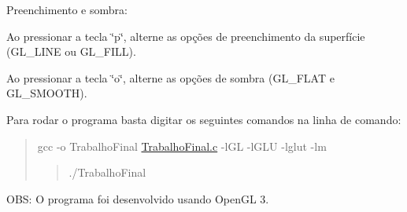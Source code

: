Preenchimento e sombra\+:
\begin{DoxyItemize}
\item Ao pressionar a tecla \char`\"{}p\char`\"{}, alterne as opções de preenchimento da superfície (G\+L\+\_\+\+L\+I\+N\+E ou G\+L\+\_\+\+F\+I\+L\+L).
\item Ao pressionar a tecla \char`\"{}o\char`\"{}, alterne as opções de sombra (G\+L\+\_\+\+F\+L\+A\+T e G\+L\+\_\+\+S\+M\+O\+O\+T\+H).
\end{DoxyItemize}

Para rodar o programa basta digitar os seguintes comandos na linha de comando\+:

\begin{quote}
gcc -\/o Trabalho\+Final \hyperlink{TrabalhoFinal_8c}{Trabalho\+Final.\+c} -\/l\+G\+L -\/l\+G\+L\+U -\/lglut -\/lm \begin{quote}
./\+Trabalho\+Final \end{quote}
\end{quote}


O\+B\+S\+: O programa foi desenvolvido usando Open\+G\+L 3. 